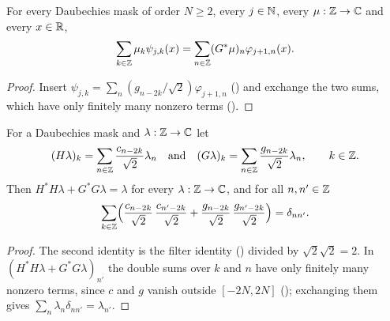\begin{lemma}
\label{lem:daub-expand-wavelet-succ}
\leanok
{}
For every Daubechies mask of order $N \geq 2$, every $j \in \mathbb{N}$, every $\mu : \mathbb{Z} \to \mathbb{C}$ and
every $x \in \mathbb{R}$,
\[
  \sum_{k \in \mathbb{Z}} \mu_k \psi_{j,k}(x) = \sum_{n \in \mathbb{Z}} (G^* \mu)_n \varphi_{j+1,n}(x) .
\]
\end{lemma}

\begin{proof}
\leanok
{}
Insert $\psi_{j,k} = \sum_n (g_{n-2k}/\sqrt 2) \varphi_{j+1,n}$ ()
and exchange the two sums, which have only finitely many nonzero terms
().
\end{proof}

\begin{proposition}
\label{prop:daub-perfect-reconstruction}
\leanok
{}
For a Daubechies mask and $\lambda : \mathbb{Z} \to \mathbb{C}$ let
\[
  (H \lambda)_k = \sum_{n \in \mathbb{Z}} \frac{c_{n-2k}}{\sqrt 2} \lambda_n
  \quad\text{and}\quad
  (G \lambda)_k = \sum_{n \in \mathbb{Z}} \frac{g_{n-2k}}{\sqrt 2} \lambda_n , \qquad k \in \mathbb{Z} .
\]
Then $H^* H \lambda + G^* G \lambda = \lambda$ for every $\lambda : \mathbb{Z} \to \mathbb{C}$, and for all
$n, n' \in \mathbb{Z}$
\[
  \sum_{k \in \mathbb{Z}} \Bigl(\frac{c_{n-2k}}{\sqrt 2} \, \frac{c_{n'-2k}}{\sqrt 2}
    + \frac{g_{n-2k}}{\sqrt 2} \, \frac{g_{n'-2k}}{\sqrt 2}\Bigr) = \delta_{nn'} .
\]
\end{proposition}

\begin{proof}
\leanok
{}
The second identity is the filter identity () divided by
$\sqrt 2 \sqrt 2 = 2$. In $(H^* H \lambda + G^* G \lambda)_{n'}$ the double sums over $k$ and $n$
have only finitely many nonzero terms, since $c$ and $g$ vanish outside $[-2N, 2N]$
(); exchanging them gives
$\sum_n \lambda_n \delta_{nn'} = \lambda_{n'}$.
\end{proof}

